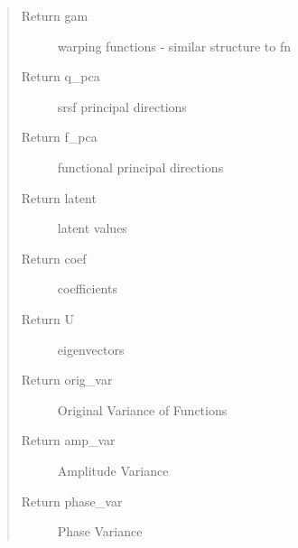 \documentclass[letterpaper,10pt,english]{sphinxmanual}
\begin{document}
\begin{fulllineitems}
\begin{quote}
\begin{description}
\item[{Return gam}] \leavevmode
warping functions - similar structure to fn

\item[{Return q\_pca}] \leavevmode
srsf principal directions

\item[{Return f\_pca}] \leavevmode
functional principal directions

\item[{Return latent}] \leavevmode
latent values

\item[{Return coef}] \leavevmode
coefficients

\item[{Return U}] \leavevmode
eigenvectors

\item[{Return orig\_var}] \leavevmode
Original Variance of Functions

\item[{Return amp\_var}] \leavevmode
Amplitude Variance

\item[{Return phase\_var}] \leavevmode
Phase Variance

\end{description}\end{quote}

\end{fulllineitems}

\end{document}
